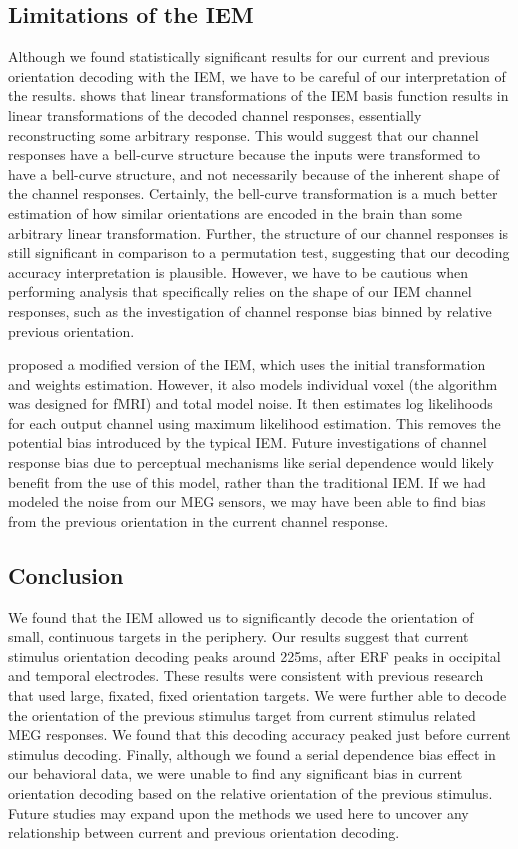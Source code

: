 \documentclass[../main.tex]{subfiles}
\begin{document}
\subsection{Limitations of the IEM}
Although we found statistically significant results for our current and previous orientation decoding with the IEM, we have to be careful of our interpretation of the results. \cite{Gardner19} shows that linear transformations of the IEM basis function results in linear transformations of the decoded channel responses, essentially reconstructing some arbitrary response. This would suggest that our channel responses have a bell-curve structure because the inputs were transformed to have a bell-curve structure, and not necessarily because of the inherent shape of the channel responses. Certainly, the bell-curve transformation is a much better estimation of how similar orientations are encoded in the brain than some arbitrary linear transformation. Further, the structure of our channel responses is still significant in comparison to a permutation test, suggesting that our decoding accuracy interpretation is plausible. However, we have to be cautious when performing analysis that specifically relies on the shape of our IEM channel responses, such as the investigation of channel response bias binned by relative previous orientation. 

\cite{vanBergen} proposed a modified version of the IEM, which uses the initial transformation and weights estimation. However, it also models individual voxel (the algorithm was designed for fMRI) and total model noise. It then estimates log likelihoods for each output channel using maximum likelihood estimation. This removes the potential bias introduced by the typical IEM. Future investigations of channel response bias due to perceptual mechanisms like serial dependence would likely benefit from the use of this model, rather than the traditional IEM. If we had modeled the noise from our MEG sensors, we may have been able to find bias from the previous orientation in the current channel response.

\subsection{Conclusion}
We found that the IEM allowed us to significantly decode the orientation of small, continuous targets in the periphery. Our results suggest that current stimulus orientation decoding peaks around 225ms, after ERF peaks in occipital and temporal electrodes. These results were consistent with previous research that used large, fixated, fixed orientation targets. We were further able to decode the orientation of the previous stimulus target from current stimulus related MEG responses. We found that this decoding accuracy peaked just before current stimulus decoding. Finally, although we found a serial dependence bias effect in our behavioral data, we were unable to find any significant bias in current orientation decoding based on the relative orientation of the previous stimulus. Future studies may expand upon the methods we used here to uncover any relationship between current and previous orientation decoding.
\end{document}
